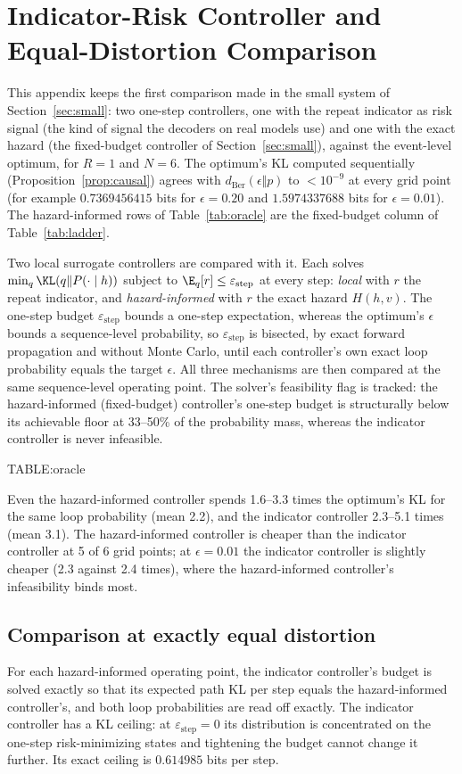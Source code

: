 \section{Indicator-Risk Controller and Equal-Distortion Comparison}\label{app:indicator}
This appendix keeps the first comparison made in the small system of Section~\ref{sec:small}: two one-step controllers, one with the repeat indicator as risk signal (the kind of signal the decoders on real models use) and one with the exact hazard (the fixed-budget controller of Section~\ref{sec:small}), against the event-level optimum, for $R=1$ and $N=6$. The optimum's KL computed sequentially (Proposition~\ref{prop:causal}) agrees with $d_{\mathrm{Ber}}(\epsilon\Vert p)$ to $<10^{-9}$ at every grid point (for example $0.7369456415$ bits for $\epsilon{=}0.20$ and $1.5974337688$ bits for $\epsilon{=}0.01$). The hazard-informed rows of Table~\ref{tab:oracle} are the fixed-budget column of Table~\ref{tab:ladder}.

Two local surrogate controllers are compared with it. Each solves $\min_q\KL(q\Vert P(\cdot\mid h))$ subject to $\E_q[r]\le\varepsilon_{\text{step}}$ at every step: \emph{local} with $r$ the repeat indicator, and \emph{hazard-informed} with $r$ the exact hazard $H(h,v)$. The one-step budget $\varepsilon_{\text{step}}$ bounds a one-step expectation, whereas the optimum's $\epsilon$ bounds a sequence-level probability, so $\varepsilon_{\text{step}}$ is bisected, by exact forward propagation and without Monte Carlo, until each controller's own exact loop probability equals the target $\epsilon$. All three mechanisms are then compared at the same sequence-level operating point. The solver's feasibility flag is tracked: the hazard-informed (fixed-budget) controller's one-step budget is structurally below its achievable floor at 33--50\% of the probability mass, whereas the indicator controller is never infeasible.

{{TABLE:oracle}}

Even the hazard-informed controller spends 1.6--3.3 times the optimum's KL for the same loop probability (mean 2.2), and the indicator controller 2.3--5.1 times (mean 3.1). The hazard-informed controller is cheaper than the indicator controller at 5 of 6 grid points; at $\epsilon{=}0.01$ the indicator controller is slightly cheaper (2.3 against 2.4 times), where the hazard-informed controller's infeasibility binds most.

\subsection{Comparison at exactly equal distortion}
\label{ssec:equaldist}
For each hazard-informed operating point, the indicator controller's budget is solved exactly so that its expected path KL per step equals the hazard-informed controller's, and both loop probabilities are read off exactly. The indicator controller has a KL ceiling: at $\varepsilon_{\text{step}}{=}0$ its distribution is concentrated on the one-step risk-minimizing states and tightening the budget cannot change it further. Its exact ceiling is $0.614985$ bits per step.

